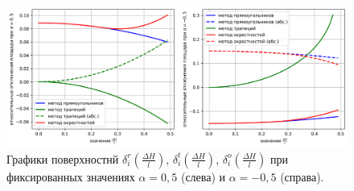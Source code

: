 \begin{figure}[ht]
\centering
\includegraphics[width=1.0\textwidth]{pics/text_1_remesh_2d/remesh_fix_alfa_chart.png}
\singlespacing
{}\caption{Графики поверхностнй $\delta_i^r(\frac{\Delta H}{l})$, $\delta_i^t(\frac{\Delta H}{l})$, $\delta_i^o(\frac{\Delta H}{l})$ при фиксированных значениях $\alpha = 0,5$ (слева) и $\alpha = -0,5$ (справа).}
\label{fig:text_1_remesh_fix_alfa_chart}
\end{figure}
